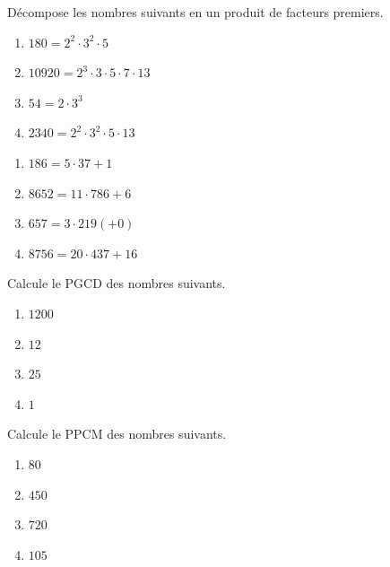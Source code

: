 \documentclass[12pt,parskip=half-, twoside=semi]{scrartcl}
\begin{document}
      \begin{exercise}
        Décompose les nombres suivants en un produit de facteurs premiers.
          \begin{enumerate}[cols=2]
            \item $180 = 2^2 \cdot 3^2 \cdot 5$
            \item $10 920 = 2^3 \cdot 3 \cdot 5 \cdot 7 \cdot 13$
            \item $54 = 2 \cdot 3^3$
            \item $2340 = 2^2 \cdot 3^2 \cdot 5 \cdot 13$
          \end{enumerate}
      \end{exercise}
      
      \begin{exercise} 
          \begin{enumerate}[cols=2]
            \item $186=5\cdot37+1$
            \item $8652=11\cdot786+6$
            \item $657=3\cdot219 (+0)$
            \item $8756=20\cdot437+16$
          \end{enumerate}
      \end{exercise}
      
      \begin{exercise}
        Calcule le PGCD des nombres suivants. 
          \begin{enumerate}[cols=2]
            \item  $1200$
            \item  $12$
            \item $25$
            \item $1$
          \end{enumerate}
      \end{exercise}
      
      \begin{exercise}
        Calcule le PPCM des nombres suivants.
          \begin{enumerate}[cols=2]
            \item $80$
            \item $450$
            \item $720$
            \item $105$
          \end{enumerate}
      \end{exercise}
      
\end{document}
